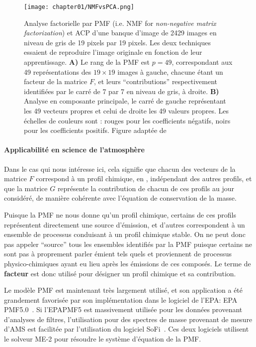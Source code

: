 \begin{figure}[ht]
    \centering
    \texttt{[image: chapter01/NMFvsPCA.png]}
    \caption{Analyse factorielle par PMF (i.e. NMF for \textit{non-negative matrix
    factorization}) et ACP d'une banque d'image de 2429 images en niveau de gris de 19
    pixels par 19 pixels. Les deux techniques essaient de reproduire l'image originale en
    fonction de leur apprentissage.
    \textbf{A)} Le rang de la PMF est $p=49$, correspondant aux 49
    représentations des $19\times19$ images à gauche, chacune étant un facteur de la
    matrice $F$, et leurs ``contributions'' respectivement identifiées par le carré de 7 par
    7 en niveau de gris, à droite.
    \textbf{B)} Analyse en composante principale, le carré de gauche représentant les 49
    vecteurs propres et celui de droite les 49 valeurs propres.
    Les échelles de couleurs sont : rouges pour les coefficients négatifs, noirs pour les
    coefficients positifs.
    Figure adaptée de \cite{leeLearning1999}}%
    \label{fig:chapter01/NMFvsPCA}
\end{figure}

\paragraph{Applicabilité en science de l'atmosphère}%
\label{par:applicabilité_en_science_de_l_atmosphère}

Dans le cas qui nous intéresse ici, cela signifie que chacun des vecteurs de la matrice
$F$ correspond à un profil chimique, en \si{\ugm}, indépendant des autres profils, et
que la matrice $G$ représente la contribution de chacun de ces profils au jour
considéré, de manière cohérente avec l'équation de conservation de la masse.

Puisque la PMF ne nous donne qu'un profil chimique, certains de ces profils représentent
directement une source d'émission, et d'autres correspondent à un ensemble de processus
conduisant à un profil chimique stable. On ne peut donc pas appeler ``source'' tous les ensembles
identifiés par la PMF puisque certains ne sont pas à proprement parler émient tels quels et
proviennent de processus physico-chimiques ayant eu lieu après les émissions de ces
composés.
Le terme de \textbf{facteur} est donc utilisé pour désigner un profil chimique et sa
contribution.

Le modèle PMF est maintenant très largement utilisé, et son application a été grandement
favorisée
par son implémentation dans le logiciel de l'EPA: EPA PMF5.0~\autocite{norrisEPA2014}.
Si l'EPAPMF5 est massivement utilisée pour les données provenant d'analyses de
filtres, l'utilisation pour des spectres de masse provenant de mesure d'AMS est facilitée par
l'utilisation du logiciel SoFi~\autocite{canonacoSoFi2013}. Ces deux logiciels utilisent
le solveur ME-2 pour résoudre le système d'équation de la PMF.

